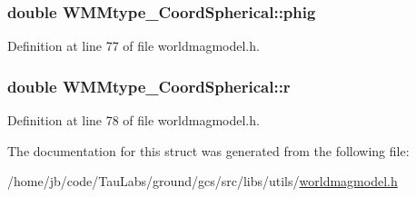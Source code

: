 \hypertarget{struct_w_m_mtype___coord_spherical_a3c1dc1afddaf89194d67521dfe135585}{
\subsubsection[{phig}]{\setlength{\rightskip}{0pt plus 5cm}double {\bf \-W\-M\-Mtype\-\_\-\-Coord\-Spherical\-::phig}}}\label{struct_w_m_mtype___coord_spherical_a3c1dc1afddaf89194d67521dfe135585}


\-Definition at line 77 of file worldmagmodel.\-h.

\hypertarget{struct_w_m_mtype___coord_spherical_a24681de24337609c5f3dc7a6346c6674}{
\subsubsection[{r}]{\setlength{\rightskip}{0pt plus 5cm}double {\bf \-W\-M\-Mtype\-\_\-\-Coord\-Spherical\-::r}}}\label{struct_w_m_mtype___coord_spherical_a24681de24337609c5f3dc7a6346c6674}


\-Definition at line 78 of file worldmagmodel.\-h.



\-The documentation for this struct was generated from the following file\-:\begin{DoxyCompactItemize}
\item 
/home/jb/code/\-Tau\-Labs/ground/gcs/src/libs/utils/\hyperlink{worldmagmodel_8h}{worldmagmodel.\-h}\end{DoxyCompactItemize}
